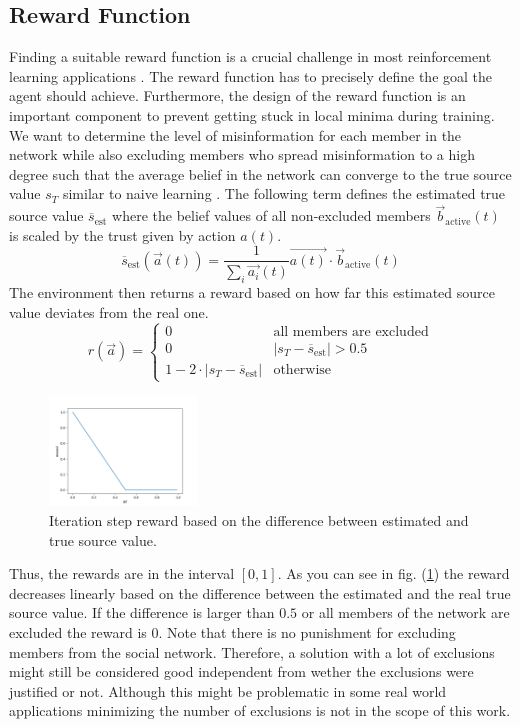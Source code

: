 \documentclass[11pt, a4paper]{article}
\begin{document}
\subsection{Reward Function}
Finding a suitable reward function is a crucial challenge in most reinforcement learning applications \cite{reward_design_1,reward_design_2}. The reward function has to precisely define the goal the agent should achieve. Furthermore, the design of the reward function is an important component to prevent getting stuck in local minima during training. \newline
We want to determine the level of misinformation for each member in the network while also excluding members who spread misinformation to a high degree such that the average belief in the network can converge to the true source value $s_T$ similar to naive learning \cite{NaiveLearning1}. The following term defines the estimated true source value $\overline{s}_{\text{est}}$ where the belief values of all non-excluded members $\vec{b}_{\text{active}}(t)$ is scaled by the trust given by action $a(t)$.
%
\begin{equation} \label{equ:s_est}
	\overline{s}_{\text{est}}(\vec{a}(t))=\frac{1}{\sum_{i}^{}\vec{a_i}(t)} \vec{a(t)} \cdot \vec{b}_{\text{active}}(t)
\end{equation}
%
The environment then returns a reward based on how far this estimated source value deviates from the real one.
%
\begin{equation}
	r(\vec{a})= \begin{cases}
		0 & \text{all members are excluded}\\
		0 & |s_T-\overline{s}_{\text{est}}|>0.5\\
		1-2 \cdot |s_T-\overline{s}_{\text{est}}| & \text{otherwise}
	\end{cases}
\end{equation} 
%
\begin{figure}
	\centering
	\includegraphics[width=0.35\textwidth]{reward_func.png}
	\caption{\label{fig:reward_func}Iteration step reward based on the difference between estimated and true source value.}
\end{figure}
%
Thus, the rewards are in the interval $[0,1]$. As you can see in fig. (\ref{fig:reward_func}) the reward decreases linearly based on the difference between the estimated and the real true source value. If the difference is larger than $0.5$ or all members of the network are excluded the reward is $0$. Note that there is no punishment for excluding members from the social network. Therefore, a solution with a lot of exclusions might still be considered good independent from wether the exclusions were justified or not. Although this might be problematic in some real world applications minimizing the number of exclusions is not in the scope of this work. \newline
\end{document}
